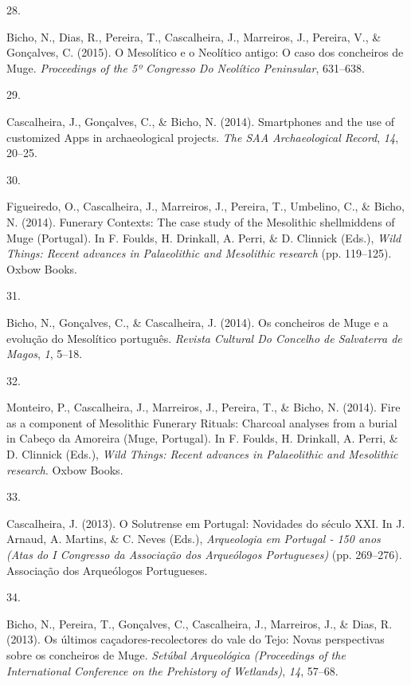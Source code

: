 \documentclass[11pt,a4paper,]{awesome-cv}
\newlength{\cslhangindent}
\newlength{\csllabelwidth}
\newenvironment{CSLReferences}[2] %
 {\begin{list}{}{%
  \setlength{\itemindent}{0pt}
  \setlength{\leftmargin}{0pt}
  \setlength{\parsep}{0pt}
  \ifodd #1
   \setlength{\leftmargin}{\cslhangindent}
   \setlength{\itemindent}{-1\cslhangindent}
  \fi
  \setlength{\itemsep}{#2\baselineskip}}}
 {\end{list}}
\newcommand{\CSLLeftMargin}[1]{\parbox[t]{\csllabelwidth}{\strut#1\strut}}
\newcommand{\CSLRightInline}[1]{\parbox[t]{\linewidth - \csllabelwidth}{\strut#1\strut}}
\begin{document}
\begin{CSLReferences}{0}{0}
\CSLLeftMargin{28. }%
\CSLRightInline{Bicho, N., Dias, R., Pereira, T., Cascalheira, J.,
Marreiros, J., Pereira, V., \& Gonçalves, C. (2015). O Mesolítico e o
Neolítico antigo: O caso dos concheiros de Muge. \emph{Proceedings of
the 5º Congresso Do Neolítico Peninsular}, 631--638.}

\CSLLeftMargin{29. }%
\CSLRightInline{Cascalheira, J., Gonçalves, C., \& Bicho, N. (2014).
Smartphones and the use of customized Apps in archaeological projects.
\emph{The SAA Archaeological Record}, \emph{14}, 20--25.}

\CSLLeftMargin{30. }%
\CSLRightInline{Figueiredo, O., Cascalheira, J., Marreiros, J., Pereira,
T., Umbelino, C., \& Bicho, N. (2014). Funerary Contexts: The case study
of the Mesolithic shellmiddens of Muge (Portugal). In F. Foulds, H.
Drinkall, A. Perri, \& D. Clinnick (Eds.), \emph{Wild Things: Recent
advances in Palaeolithic and Mesolithic research} (pp. 119--125). Oxbow
Books.}

\CSLLeftMargin{31. }%
\CSLRightInline{Bicho, N., Gonçalves, C., \& Cascalheira, J. (2014). Os
concheiros de Muge e a evolução do Mesolítico português. \emph{Revista
Cultural Do Concelho de Salvaterra de Magos}, \emph{1}, 5--18.}

\CSLLeftMargin{32. }%
\CSLRightInline{Monteiro, P., Cascalheira, J., Marreiros, J., Pereira,
T., \& Bicho, N. (2014). Fire as a component of Mesolithic Funerary
Rituals: Charcoal analyses from a burial in Cabeço da Amoreira (Muge,
Portugal). In F. Foulds, H. Drinkall, A. Perri, \& D. Clinnick (Eds.),
\emph{Wild Things: Recent advances in Palaeolithic and Mesolithic
research}. Oxbow Books.}

\CSLLeftMargin{33. }%
\CSLRightInline{Cascalheira, J. (2013). O Solutrense em Portugal:
Novidades do século XXI. In J. Arnaud, A. Martins, \& C. Neves (Eds.),
\emph{Arqueologia em Portugal - 150 anos (Atas do I Congresso da
Associação dos Arqueólogos Portugueses)} (pp. 269--276). Associação dos
Arqueólogos Portugueses.}

\CSLLeftMargin{34. }%
\CSLRightInline{Bicho, N., Pereira, T., Gonçalves, C., Cascalheira, J.,
Marreiros, J., \& Dias, R. (2013). Os últimos caçadores-recolectores do
vale do Tejo: Novas perspectivas sobre os concheiros de Muge.
\emph{Setúbal Arqueológica (Proceedings of the International Conference
on the Prehistory of Wetlands)}, \emph{14}, 57--68.}


\end{CSLReferences}
\end{document}
